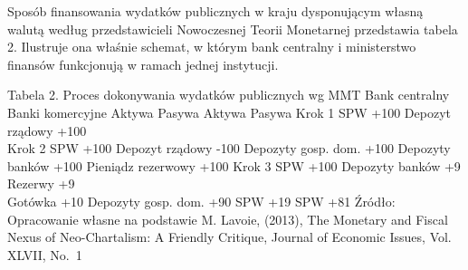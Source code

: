 \documentclass[
]{book}
\begin{document}
Sposób finansowania wydatków publicznych w kraju dysponującym własną walutą według przedstawicieli Nowoczesnej Teorii Monetarnej przedstawia tabela 2. Ilustruje ona właśnie schemat, w którym bank centralny i ministerstwo finansów funkcjonują w ramach jednej instytucji.

Tabela 2. Proces dokonywania wydatków publicznych wg MMT
Bank centralny Banki komercyjne
Aktywa Pasywa Aktywa Pasywa
Krok 1 SPW +100 Depozyt rządowy +100\\
Krok 2 SPW +100 Depozyt rządowy -100 Depozyty gosp. dom. +100
Depozyty banków +100 Pieniądz rezerwowy +100
Krok 3 SPW +100 Depozyty banków +9 Rezerwy +9\\
Gotówka +10 Depozyty gosp. dom. +90
SPW +19 SPW +81
Źródło: Opracowanie własne na podstawie M. Lavoie, (2013), The Monetary and Fiscal Nexus of Neo-Chartalism: A Friendly Critique, Journal of Economic Issues, Vol. XLVII, No.~1
\end{document}
